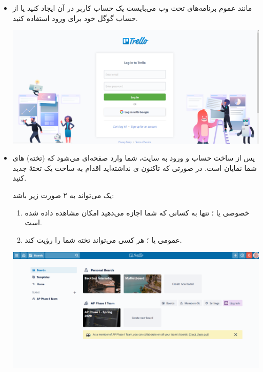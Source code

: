 \documentclass[]{article}
\begin{document}
\begin{itemize}

\item

مانند عموم برنامه‌های تحت وب می‌بایست یک حساب کاربر در آن ایجاد کنید یا از حساب گوگل خود برای ورود استفاده کنید.

\begin{center}

\includegraphics[width=1.0\textwidth]{images/image1.png}

\end{center}

\item

پس از ساخت حساب و ورود به سایت، شما وارد صفحه‌ای می‌شود که  (تخته)‌ های شما نمایان است. در صورتی که تاکنون ی نداشته‌اید اقدام به ساخت یک تختهٔ جدید کنید.

یک  می‌تواند به ۲ صورت زیر باشد:

\begin{enumerate}

\item
خصوصی یا ؛ تنها به کسانی که شما اجازه می‌دهید امکان مشاهده داده شده است.

\item
عمومی یا ؛ هر کسی می‌تواند تخته شما را رؤیت کند.

\end{enumerate}

\begin{center}

\includegraphics[width=1.0\textwidth]{images/image4.png}


\end{center}
\end{itemize}
\end{document}
